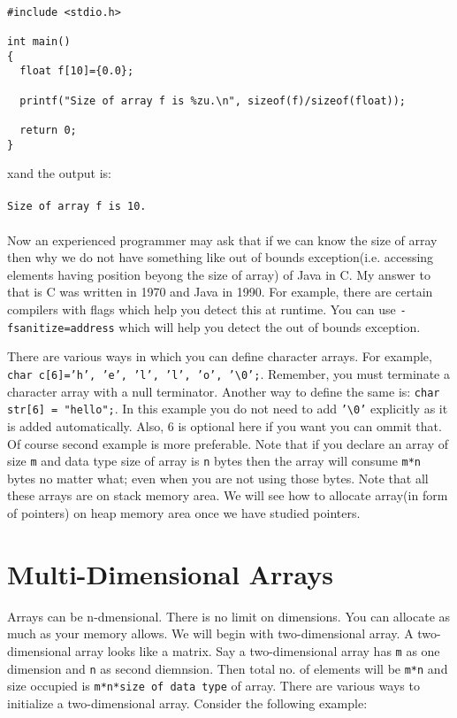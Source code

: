 \begin{verbatim}

#include <stdio.h>

int main()
{
  float f[10]={0.0};

  printf("Size of array f is %zu.\n", sizeof(f)/sizeof(float));

  return 0;
}
\end{verbatim}
xand the output is:
\\\\\texttt{Size of array f is 10.\\\\}
Now an experienced programmer may ask that if we can know the size of array
then why we do not have something like out of bounds exception(i.e. accessing
elements having position beyong the size of array) of Java in C. My
answer to that is C was written in 1970 and Java in 1990. For example, there
are certain compilers with flags which help you detect this at runtime. You can
use \texttt{-fsanitize=address} which will help you detect the out of bounds
exception.

There are various ways in which you can define character arrays. For example,
\texttt{char c[6]={'h', 'e', 'l', 'l', 'o', '\textbackslash 0'};}. Remember, you must
terminate a character array with a null terminator. Another way to define the
same is: \texttt{char str[6] = "hello";}. In this example you do not need to
add \texttt{'\textbackslash 0'} explicitly as it is added automatically. Also, 6 is optional
here if you want you can ommit that. Of course second example is more
preferable. Note that if you declare an array of size \texttt{m} and data type
size of array is \texttt{n} bytes then the array will consume \texttt{m*n}
bytes no matter what; even when you are not using those bytes. Note that all
these arrays are on stack memory area. We will see how to allocate array(in
form of pointers) on heap memory area once we have studied pointers.

\section{Multi-Dimensional Arrays}
Arrays can be n-dmensional. There is no limit on dimensions. You can allocate
as much as your memory allows. We will begin with two-dimensional array. A
two-dimensional array looks like a matrix. Say a two-dimensional array has
\texttt{m} as one dimension and \texttt{n} as second diemnsion. Then total
no. of elements will be \texttt{m*n} and size occupied is \texttt{m*n*size of
  data type} of array. There are various ways to initialize a two-dimensional
array. Consider the following example:

